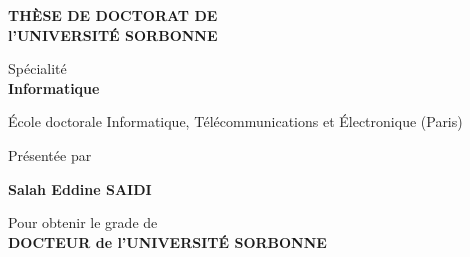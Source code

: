 \thispagestyle{empty}


{\large

\vspace*{1cm}

\begin{center}

{\bf TH\`ESE DE DOCTORAT DE \\ l'UNIVERSIT\'E SORBONNE}

\vspace*{0.5cm}

Sp\'ecialit\'e \\ [2ex]
{\bf Informatique}\ \\ 

\vspace*{0.5cm}

\'Ecole doctorale Informatique, T\'el\'ecommunications et \'Electronique (Paris)

\vspace*{1cm}


Pr\'esent\'ee par \ \\


\vspace*{0.5cm}


{\Large {\bf Salah Eddine SAIDI}}

\vspace*{1cm}
Pour obtenir le grade de \ \\[1ex]
{\bf DOCTEUR de l'UNIVERSIT\'E SORBONNE} \ \\

\vspace*{1cm}

\end{center}

}
